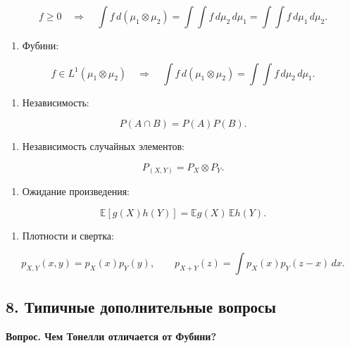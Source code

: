 \documentclass[
  11pt,
  a4paper,
]{article}
\providecommand{\tightlist}{%
  \setlength{\itemsep}{0pt}\setlength{\parskip}{0pt}}
\begin{document}
\[
f\ge0
\quad\Rightarrow\quad
\int f\,d(\mu_1\otimes\mu_2)
=
\int\int f\,d\mu_2\,d\mu_1
=
\int\int f\,d\mu_1\,d\mu_2.
\]

\begin{enumerate}
\def\labelenumi{\arabic{enumi}.}
\setcounter{enumi}{2}
\tightlist
\item
  Фубини:
\end{enumerate}

\[
f\in L^1(\mu_1\otimes\mu_2)
\quad\Rightarrow\quad
\int f\,d(\mu_1\otimes\mu_2)
=
\int\int f\,d\mu_2\,d\mu_1.
\]

\begin{enumerate}
\def\labelenumi{\arabic{enumi}.}
\setcounter{enumi}{3}
\tightlist
\item
  Независимость:
\end{enumerate}

\[
P(A\cap B)=P(A)P(B).
\]

\begin{enumerate}
\def\labelenumi{\arabic{enumi}.}
\setcounter{enumi}{4}
\tightlist
\item
  Независимость случайных элементов:
\end{enumerate}

\[
P_{(X,Y)}=P_X\otimes P_Y.
\]

\begin{enumerate}
\def\labelenumi{\arabic{enumi}.}
\setcounter{enumi}{5}
\tightlist
\item
  Ожидание произведения:
\end{enumerate}

\[
\mathbb E[g(X)h(Y)]
=
\mathbb E g(X)\,\mathbb E h(Y).
\]

\begin{enumerate}
\def\labelenumi{\arabic{enumi}.}
\setcounter{enumi}{6}
\tightlist
\item
  Плотности и свертка:
\end{enumerate}

\[
p_{X,Y}(x,y)=p_X(x)p_Y(y),
\qquad
p_{X+Y}(z)=\int p_X(x)p_Y(z-x)\,dx.
\]

\subsection{8. Типичные дополнительные
вопросы}\label{ux442ux438ux43fux438ux447ux43dux44bux435-ux434ux43eux43fux43eux43bux43dux438ux442ux435ux43bux44cux43dux44bux435-ux432ux43eux43fux440ux43eux441ux44b}

\textbf{Вопрос. Чем Тонелли отличается от Фубини?}
\end{document}
